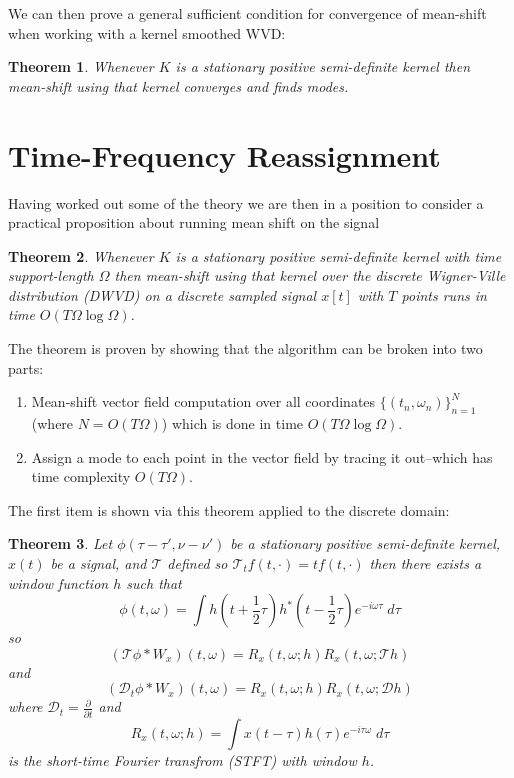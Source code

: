 \documentclass[english]{article}
\newtheorem{thm}{Theorem}[section]
\begin{document}
We can then prove a general sufficient condition for convergence of mean-shift when
working with a kernel smoothed WVD:
\begin{thm}
Whenever $K$ is a stationary positive semi-definite kernel then mean-shift using that kernel
converges and finds modes. 
\begin{equation}

\end{equation}
\end{thm}

\section{Time-Frequency Reassignment}

Having worked out some of the theory
we are then in a position to consider a practical proposition about running
mean shift on the signal
\begin{thm}
Whenever $K$ is a stationary positive semi-definite kernel with time support-length $\Omega$
 then mean-shift using that kernel
over the discrete Wigner-Ville distribution (DWVD) on a discrete sampled signal $x[t]$ with
$T$ points runs in time $O(T\Omega\log \Omega)$.
\end{thm}
The theorem is proven by showing that the algorithm can be broken into two parts:
\begin{enumerate}
\item Mean-shift vector field computation over all coordinates $\{(t_n,\omega_n)\}_{n=1}^N$ (where $N=O(T\Omega)$) which is
done in time $O(T\Omega\log\Omega)$.
\item Assign a mode to each point in the vector field by tracing it out--which has time complexity $O(T\Omega)$.
\end{enumerate}
The first item is shown via this theorem applied to the discrete domain:
\begin{thm}
Let $\phi(\tau-\tau',\nu-\nu')$ be a stationary positive semi-definite kernel, $x(t)$ be a signal, and $\mathcal{T}$ defined so
 $\mathcal{T}_tf(t,\cdot)=tf(t,\cdot)$ then there exists a window function $h$ such that
\begin{equation}
\phi(t,\omega) = \int h(t+\frac{1}{2}\tau)h^*(t-\frac{1}{2}\tau)e^{-i\omega\tau}\;d\tau
\end{equation}
so
\begin{equation}
(\mathcal{T}\phi * W_x)(t,\omega) = R_x(t,\omega;h) R_x(t,\omega; \mathcal{T}h)
\end{equation}
and
\begin{equation}
(\mathcal{D}_t\phi * W_x)(t,\omega) = R_x(t,\omega;h) R_x(t,\omega; \mathcal{D}h)
\end{equation}
where $\mathcal{D}_t=\frac{\partial}{\partial t}$ and
\begin{equation}
R_x(t,\omega; h) = \int x(t-\tau)h(\tau)e^{-i\tau\omega}\; d\tau
\end{equation}
is the short-time Fourier transfrom (STFT) with window $h$.
\end{thm}
\end{document}
